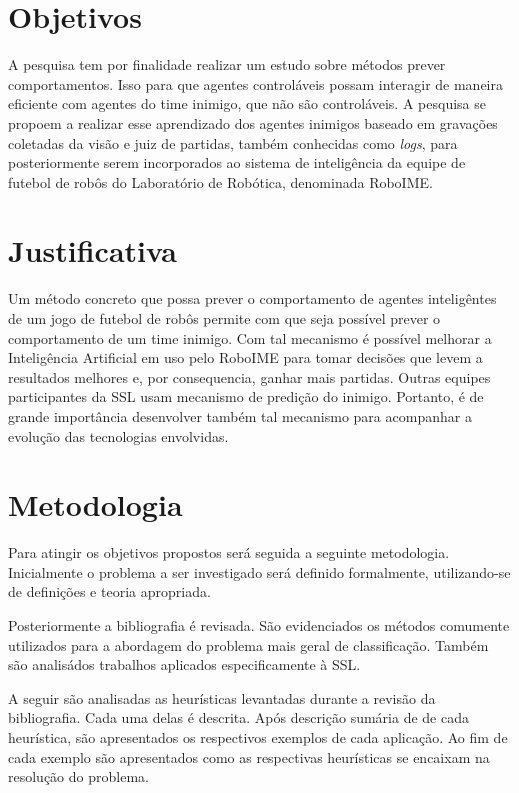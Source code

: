 \section{Objetivos}

A pesquisa tem por finalidade realizar um estudo sobre métodos prever comportamentos.
Isso para que agentes controláveis
possam interagir de maneira eficiente com agentes do time inimigo, que não são controláveis.
A pesquisa se propoem a realizar esse aprendizado dos agentes inimigos baseado em gravações
coletadas da visão e juiz de partidas, também conhecidas como \textit{logs}, para posteriormente
serem incorporados ao sistema de inteligência da equipe de futebol de robôs do Laboratório
de Robótica, denominada RoboIME.

\section{Justificativa}

Um método concreto que possa prever o comportamento de agentes inteligêntes de um jogo de
futebol de robôs permite com que seja possível prever o comportamento de um time inimigo.
Com tal mecanismo é possível melhorar a Inteligência Artificial em uso pelo RoboIME
para tomar decisões que levem a resultados melhores e, por consequencia, ganhar mais partidas.
Outras equipes participantes da SSL usam mecanismo de predição do inimigo.
Portanto, é de grande importância desenvolver também tal mecanismo para acompanhar a evolução
das tecnologias envolvidas.

\section{Metodologia}

Para atingir os objetivos propostos será seguida a seguinte metodologia.
Inicialmente o problema a ser investigado será definido formalmente,
utilizando-se de definições e teoria apropriada.

Posteriormente a bibliografia é revisada. São evidenciados os métodos comumente
utilizados para a abordagem do problema mais geral de classificação. Também são
analisádos trabalhos aplicados especificamente à SSL.

A seguir são analisadas as heurísticas levantadas durante a
revisão da bibliografia. Cada uma delas é descrita. Após descrição sumária de
de cada heurística, são apresentados os respectivos exemplos de cada aplicação.
Ao fim de cada exemplo são apresentados como as respectivas heurísticas se encaixam na
resolução do problema.

